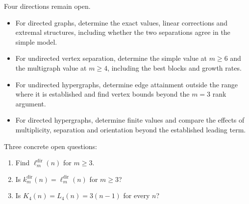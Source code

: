 Four directions remain open.
\begin{itemize}
\item For directed graphs, determine the exact values, linear corrections and
extremal structures, including whether the two separations agree in the simple model.
\item For undirected vertex separation, determine the simple value at $m\ge6$
and the multigraph value at $m\ge4$, including the best blocks and growth rates.
\item For undirected hypergraphs, determine edge attainment outside the range
where it is established and find vertex bounds beyond the $m=3$ rank argument.
\item For directed hypergraphs, determine finite values and compare the effects
of multiplicity, separation and orientation beyond the established leading term.
\end{itemize}
Three concrete open questions:
\begin{enumerate}
\item Find $\ell_m^{\mathrm{dir}}(n)$ for $m\ge3$.
\item Is $k_m^{\mathrm{dir}}(n)=\ell_m^{\mathrm{dir}}(n)$ for $m\ge3$?
\item Is $K_4(n)=L_4(n)=3(n-1)$ for every $n$?
\end{enumerate}
